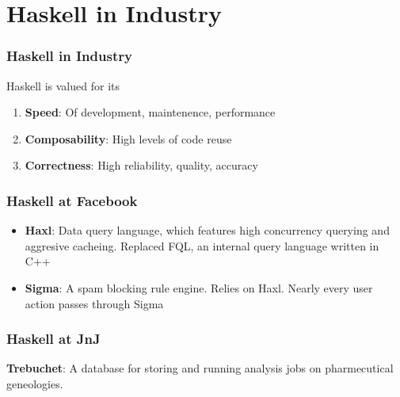 \section{Haskell in Industry}

\frame{\sectionpage}


\begin{frame}
\frametitle{Haskell in Industry}

Haskell is valued for its

\begin{enumerate}

\item {\bf Speed}: Of development, maintenence, performance
  \pause
\item {\bf Composability}: High levels of code reuse
  \pause
\item {\bf Correctness}: High reliability, quality, accuracy

\end{enumerate}

\end{frame}


\begin{frame}
\frametitle{Haskell at Facebook}

\begin{itemize}
    \item {\bf Haxl}: Data query language, which features high concurrency querying
            and aggresive cacheing. Replaced FQL, an internal query language
            written in C++
    \item {\bf Sigma}: A spam blocking rule engine. Relies on Haxl. Nearly every user action
             passes through Sigma
\end{itemize}

\end{frame}


\begin{frame}
\frametitle{Haskell at JnJ}

{\bf Trebuchet}: A database for storing and running analysis jobs on pharmecutical
                 geneologies.

\end{frame}

